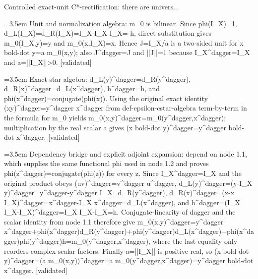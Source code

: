 \documentclass{article}
\newcommand{\step}[1]{\par\noindent\hangindent=3.5em\hangafter=1%
  \makebox[3.5em][l]{\textbf{#1.}}}
\newcommand{\steptag}[1]{\hfill{\small\textsf{[#1]}}}
\begin{document}
\begin{proofbox}{Controlled exact-unit C*-rectification: there are univers...}
\step{1.2.1} Unit and normalization algebra: m\_0 is bilinear. Since phi(I\_X)=1, d\_L(I\_X)=d\_R(I\_X)=I\_X-I\_X I\_X=-h, direct substitution gives m\_0(I\_X,y)=y and m\_0(x,I\_X)=x. Hence J=I\_X/a is a two-sided unit for x bold-dot y=a m\_0(x,y); also J\textasciicircum{}dagger=J and ||J||=1 because I\_X\textasciicircum{}dagger=I\_X and a=||I\_X||>0. \steptag{validated} \\[4pt]
\step{1.2.2} Exact star algebra: d\_L(y)\textasciicircum{}dagger=d\_R(y\textasciicircum{}dagger), d\_R(x)\textasciicircum{}dagger=d\_L(x\textasciicircum{}dagger), h\textasciicircum{}dagger=h, and phi(x\textasciicircum{}dagger)=conjugate(phi(x)). Using the original exact identity (xy)\textasciicircum{}dagger=y\textasciicircum{}dagger x\textasciicircum{}dagger from def-epsilon-cstar-algebra term-by-term in the formula for m\_0 yields m\_0(x,y)\textasciicircum{}dagger=m\_0(y\textasciicircum{}dagger,x\textasciicircum{}dagger); multiplication by the real scalar a gives (x bold-dot y)\textasciicircum{}dagger=y\textasciicircum{}dagger bold-dot x\textasciicircum{}dagger. \steptag{validated} \\[6pt]
\step{1.2.2.1} Dependency bridge and explicit adjoint expansion: depend on node 1.1, which supplies the same functional phi used in node 1.2 and proves phi(z\textasciicircum{}dagger)=conjugate(phi(z)) for every z. Since I\_X\textasciicircum{}dagger=I\_X and the original product obeys (uv)\textasciicircum{}dagger=v\textasciicircum{}dagger u\textasciicircum{}dagger, d\_L(y)\textasciicircum{}dagger=(y-I\_X y)\textasciicircum{}dagger=y\textasciicircum{}dagger-y\textasciicircum{}dagger I\_X=d\_R(y\textasciicircum{}dagger), d\_R(x)\textasciicircum{}dagger=(x-x I\_X)\textasciicircum{}dagger=x\textasciicircum{}dagger-I\_X x\textasciicircum{}dagger=d\_L(x\textasciicircum{}dagger), and h\textasciicircum{}dagger=(I\_X I\_X-I\_X)\textasciicircum{}dagger=I\_X I\_X-I\_X=h. Conjugate-linearity of dagger and the scalar identity from node 1.1 therefore give m\_0(x,y)\textasciicircum{}dagger=y\textasciicircum{}dagger x\textasciicircum{}dagger+phi(x\textasciicircum{}dagger)d\_R(y\textasciicircum{}dagger)+phi(y\textasciicircum{}dagger)d\_L(x\textasciicircum{}dagger)+phi(x\textasciicircum{}dagger)phi(y\textasciicircum{}dagger)h=m\_0(y\textasciicircum{}dagger,x\textasciicircum{}dagger), where the last equality only reorders complex scalar factors. Finally a=||I\_X|| is positive real, so (x bold-dot y)\textasciicircum{}dagger=(a m\_0(x,y))\textasciicircum{}dagger=a m\_0(y\textasciicircum{}dagger,x\textasciicircum{}dagger)=y\textasciicircum{}dagger bold-dot x\textasciicircum{}dagger. \steptag{validated} \\[4pt]

\end{proofbox}
\end{document}
